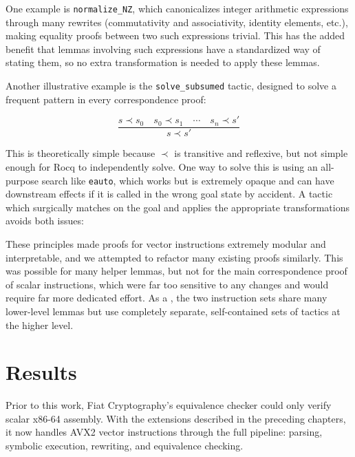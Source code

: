 One example is \texttt{normalize_NZ}, which canonicalizes integer arithmetic expressions through many rewrites (commutativity and associativity, identity elements, etc.), making equality proofs between two such expressions trivial.
This has the added benefit that lemmas involving such expressions have a standardized way of stating them, so no extra transformation is needed to apply these lemmas.

Another illustrative example is the \texttt{solve\_subsumed} tactic, designed to solve a frequent pattern in every correspondence proof: 

\[
  \frac{s \prec s_0 \quad s_0 \prec s_1 \quad \cdots \quad s_n \prec s'}{s \prec
   s'}
  \]

This is theoretically simple because $\prec$ is transitive and reflexive, but not simple enough for Rocq to independently solve.
One way to solve this is using an all-purpose search like \texttt{eauto}, which works but is extremely opaque and can have downstream effects if it is called in the wrong goal state by accident.
A tactic which surgically matches on the goal and applies the appropriate transformations avoids both issues:


These principles made proofs for vector instructions extremely modular and interpretable, and we attempted to refactor many existing proofs similarly. This was possible for many helper lemmas, but not for the main correspondence proof of scalar instructions, which were far too sensitive to any changes and would require far more dedicated effort. As a , the two instruction sets share many lower-level lemmas but use completely separate, self-contained sets of tactics at the higher level. 



\chapter{Results}
\label{ch:results}

Prior to this work, Fiat Cryptography's equivalence checker could only verify scalar x86-64 assembly.
With the extensions described in the preceding chapters, it now handles AVX2 vector instructions through the full pipeline: parsing, symbolic execution, rewriting, and equivalence checking.

